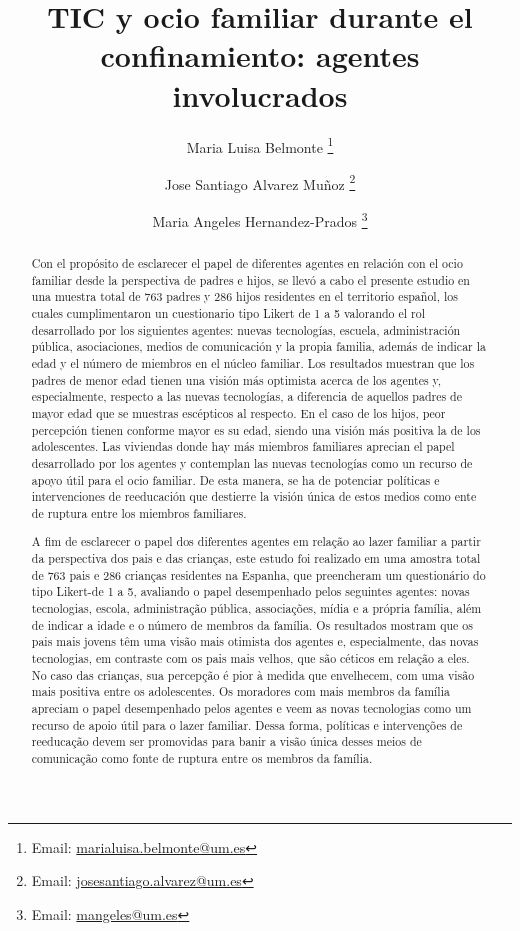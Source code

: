 \documentclass[spanish]{textolivre}
\title{TIC y ocio familiar durante el confinamiento: agentes involucrados}
\author[1]{Maria Luisa Belmonte \orcid{0000-0002-1475-3690} \thanks{Email: \url{marialuisa.belmonte@um.es}}}
\author[1]{Jose Santiago Alvarez Muñoz \orcid{0000-0002-9740-6175} \thanks{Email: \url{josesantiago.alvarez@um.es}}}
\author[2]{Maria Angeles Hernandez-Prados \orcid{0000-0002-3617-215X} \thanks{Email: \url{mangeles@um.es}}}
\affil[1]{Universidad de Murcia, Facultad de Educación, Departamento de Métodos de Investigación y Diagnóstico en Educación, Murcia, España.}
\affil[2]{Universidad de Murcia, Facultad de Educación, Departamento de Teoría e Historia de la Educación, Murcia, España.}
\begin{document}
\maketitle

\begin{polyabstract}
\begin{abstract}
Con el propósito de esclarecer el papel de diferentes agentes en relación con el ocio familiar desde la perspectiva de padres e hijos, se llevó a cabo el presente estudio en una muestra total de 763 padres y 286 hijos residentes en el territorio español, los cuales cumplimentaron un cuestionario tipo Likert de 1 a 5 valorando el rol desarrollado por los siguientes agentes: nuevas tecnologías, escuela, administración pública, asociaciones, medios de comunicación y la propia familia, además de indicar la edad y el número de miembros en el núcleo familiar. Los resultados muestran que los padres de menor edad tienen una visión más optimista acerca de los agentes y, especialmente, respecto a las nuevas tecnologías, a diferencia de aquellos padres de mayor edad que se muestras escépticos al respecto. En el caso de los hijos, peor percepción tienen conforme mayor es su edad, siendo una visión más positiva la de los adolescentes. Las viviendas donde hay más miembros familiares aprecian el papel desarrollado por los agentes y contemplan las nuevas tecnologías como un recurso de apoyo útil para el ocio familiar. De esta manera, se ha de potenciar políticas e intervenciones de reeducación que destierre la visión única de estos medios como ente de ruptura entre los miembros familiares. 

\end{abstract}

\begin{portuguese}
\begin{abstract}
A fim de esclarecer o papel dos diferentes agentes em relação ao lazer familiar a partir da perspectiva dos pais e das crianças, este estudo foi realizado em uma amostra total de 763 pais e 286 crianças residentes na Espanha, que preencheram um questionário do tipo Likert-de 1 a 5, avaliando o papel desempenhado pelos seguintes agentes: novas tecnologias, escola, administração pública, associações, mídia e a própria família, além de indicar a idade e o número de membros da família. Os resultados mostram que os pais mais jovens têm uma visão mais otimista dos agentes e, especialmente, das novas tecnologias, em contraste com os pais mais velhos, que são céticos em relação a eles. No caso das crianças, sua percepção é pior à medida que envelhecem, com uma visão mais positiva entre os adolescentes. Os moradores com mais membros da família apreciam o papel desempenhado pelos agentes e veem as novas tecnologias como um recurso de apoio útil para o lazer familiar. Dessa forma, políticas e intervenções de reeducação devem ser promovidas para banir a visão única desses meios de comunicação como fonte de ruptura entre os membros da família.


\end{abstract}
\end{portuguese}
\end{polyabstract}
\end{document}
